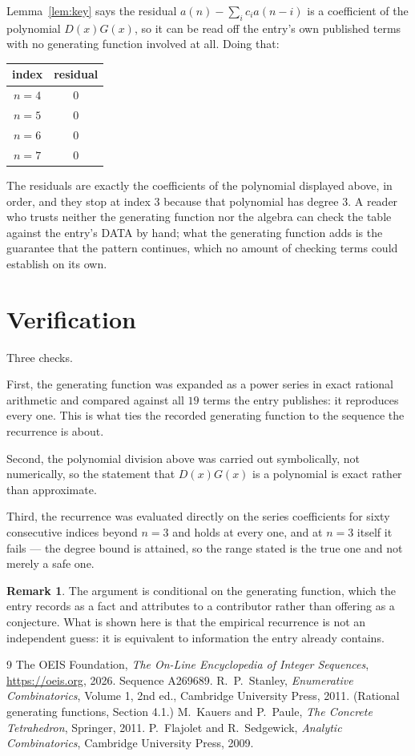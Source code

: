 \documentclass[11pt,a4paper]{article}
\theoremstyle{plain}
\theoremstyle{definition}
\newtheorem{remark}[theorem]{Remark}
\begin{document}
Lemma~\ref{lem:key} says the residual $a(n)-\sum_ic_ia(n-i)$ is a coefficient of the
polynomial $D(x)G(x)$, so it can be read off the entry's own published terms with no
generating function involved at all. Doing that:
\begin{center}
\begin{tabular}{cc}
index & residual \\ \hline
$n=4$ & $0$ \\
$n=5$ & $0$ \\
$n=6$ & $0$ \\
$n=7$ & $0$
\end{tabular}
\end{center}
The residuals are exactly the coefficients of the polynomial displayed above, in order, and
they stop at index $3$ because that polynomial has degree $3$. A reader who trusts
neither the generating function nor the algebra can check the table against the entry's DATA
by hand; what the generating function adds is the guarantee that the pattern continues, which
no amount of checking terms could establish on its own.

\section{Verification}

Three checks.

First, the generating function was expanded as a power series in exact rational arithmetic and
compared against all $19$ terms the entry publishes: it reproduces every one. This is
what ties the recorded generating function to the sequence the recurrence is about.

Second, the polynomial division above was carried out symbolically, not numerically, so the
statement that $D(x)G(x)$ is a polynomial is exact rather than approximate.

Third, the recurrence was evaluated directly on the series coefficients for sixty consecutive
indices beyond $n=3$ and holds at every one, and at $n=3$ itself it fails --- the
degree bound is attained, so the range stated is the true one and not merely a safe one.

\begin{remark}
The argument is conditional on the generating function, which the entry records as a fact and
attributes to a contributor rather than offering as a conjecture. What is shown here is that
the empirical recurrence is not an independent guess: it is equivalent to information the
entry already contains.
\end{remark}

\begin{thebibliography}{9}
 The OEIS Foundation, \emph{The On-Line Encyclopedia of Integer
Sequences}, \url{https://oeis.org}, 2026. Sequence A269689.
 R.~P.~Stanley, \emph{Enumerative Combinatorics}, Volume 1, 2nd ed.,
Cambridge University Press, 2011. (Rational generating functions, Section 4.1.)
 M.~Kauers and P.~Paule, \emph{The Concrete Tetrahedron}, Springer, 2011.
 P.~Flajolet and R.~Sedgewick, \emph{Analytic Combinatorics}, Cambridge
University Press, 2009.
\end{thebibliography}
\end{document}

